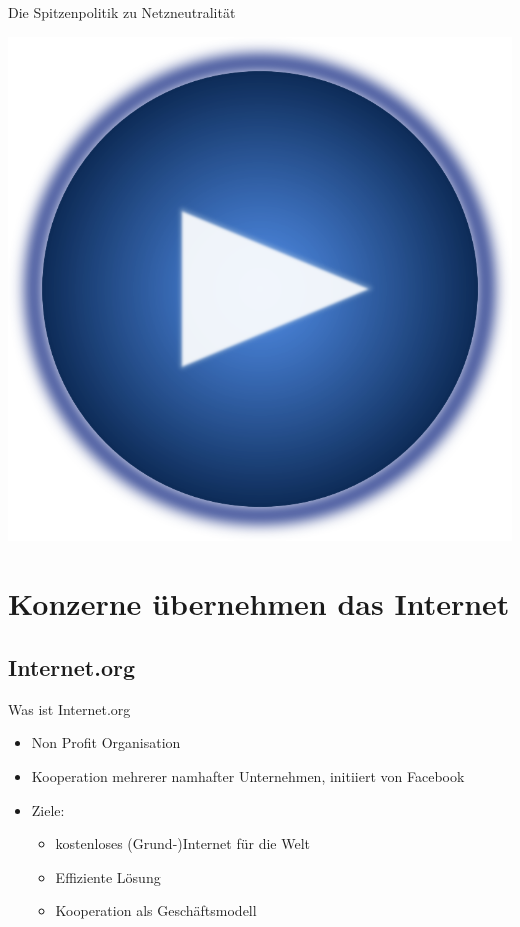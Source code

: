 \documentclass{beamer}
\begin{document}
\begin{frame}{Die Spitzenpolitik zu Netzneutralität}
\begin{center}
\href{https://www.youtube.com/watch?v=_ZaaSC7Eg4s}{
	\centering
	\includegraphics[scale=0.15]{pics/Play-button.png}
}
\end{center}
\end{frame}



\section{Konzerne übernehmen das Internet}
\subsection{Internet.org}
\begin{frame}{Was ist Internet.org}
\begin{itemize}
	\item Non Profit Organisation
	\item Kooperation mehrerer namhafter Unternehmen, initiiert von Facebook
	\item Ziele: 
	\begin{itemize}%
		\item kostenloses (Grund-)Internet für die Welt
		\item Effiziente Lösung
		\item Kooperation als Geschäftsmodell
	\end{itemize}
\end{itemize}
\end{frame}
\end{document}
